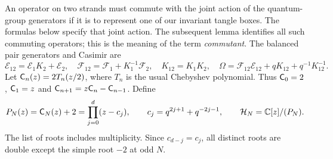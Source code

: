 An operator on two strands must commute with the joint action of the quantum-group generators if it is to represent one of our invariant tangle boxes. The formulas below specify that joint action. The subsequent lemma identifies all such commuting operators; this is the meaning of the term \emph{commutant}.
The balanced pair generators and Casimir are
\begin{equation}\label{eq:pair-casimir}
 \mathcal E_{12}=\mathcal E_1K_2+\mathcal E_2,\quad
 \mathcal F_{12}=\mathcal F_1+K_1^{-1}\mathcal F_2,\quad
 K_{12}=K_1K_2,\quad
 \Omega=\mathcal F_{12}\mathcal E_{12}+qK_{12}+q^{-1}K_{12}^{-1}.
\end{equation}
Let $\mathsf C_n(z)=2T_n(z/2)$, where $T_n$ is the usual Chebyshev polynomial. Thus $\mathsf C_0=2$, $\mathsf C_1=z$ and $\mathsf C_{n+1}=z\mathsf C_n-\mathsf C_{n-1}$. Define
\begin{equation}\label{eq:hermite-algebra}
 P_N(z)=\mathsf C_N(z)+2=\prod_{j=0}^{d}(z-c_j),\qquad
 c_j=q^{2j+1}+q^{-2j-1},\qquad
 \mathcal H_N=\mathbb C[z]/(P_N).
\end{equation}
The list of roots includes multiplicity. Since $c_{d-j}=c_j$, all distinct roots are double except the simple root $-2$ at odd $N$.

